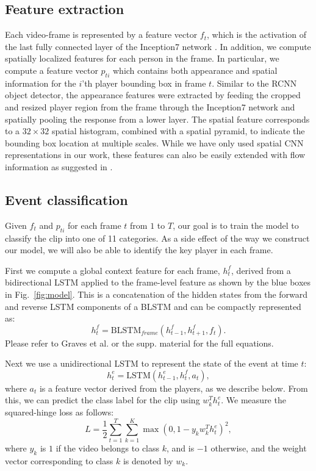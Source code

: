 \subsection{Feature extraction}
\label{sec:feature_extraction}
Each video-frame is represented by a feature vector $f_t$, which is the
activation of the last fully connected layer of the Inception7 network
\cite{Ioffe_arxiv15,Inception7}.  In addition, we compute spatially localized
features for each person in the frame. In particular, we compute a feature
vector $p_{ti}$ which contains both appearance and spatial information for the
$i$'th player bounding box in frame $t$.
Similar to the RCNN object
detector\cite{Girshick_CVPR14}, the appearance features were extracted by feeding the cropped
and resized player region from the frame through the Inception7 network and
spatially pooling the response from a lower layer. The spatial feature
corresponds to a $32\times 32$ spatial histogram, combined with a spatial pyramid, to
indicate the bounding box location at multiple scales.
While we have only used spatial CNN representations in our
work, these features can also be easily extended with flow information as
suggested in \cite{Simonyan_NIPS14}.

\subsection{Event classification}

Given $f_t$ and $p_{ti}$ for each frame $t$ from $1$ to $T$, our goal
is to train the model to classify the clip into one of 11 categories. As a side
effect of the way we construct our model, we will also be able to identify the
key player in each frame.

First we compute a global context feature for each frame, $h_t^f$, derived from
a bidirectional LSTM applied to the frame-level feature as shown 
by the blue boxes in Fig.~\ref{fig:model}.
This is a concatenation of the hidden states from the forward and reverse LSTM
components of a BLSTM and can be compactly represented as:
\[
  h_t^f = \mbox{BLSTM}_{frame}(h_{t-1}^f, h_{t+1}^f, f_t).
\]Please refer to Graves et al. \cite{Graves_2013} or the supp. material
for the full equations.

Next we use  a unidirectional LSTM to represent the state of the
event at time $t$:
\begin{equation}
  \label{eq:event_lstm}
h_t^e = \mbox{LSTM}(h_{t-1}^e, h_t^f, a_t),
\end{equation}
where $a_t$ is a feature vector derived from the players, as we
describe below.
From this, we can predict the class label for the clip using $w_k^T
h_t^e$. We measure the squared-hinge loss as follows:
\begin{equation}
  L =   \frac{1}{2} \sum_{t=1}^T \sum_{k = 1}^K \max (0, 1 - y_k w_k^T h^e_t)^2,
\end{equation} 
where $y_k$ is $1$ if the video belongs to class $k$,
and is $-1$ otherwise, and the weight vector corresponding to
class $k$ is denoted by $w_k$.

